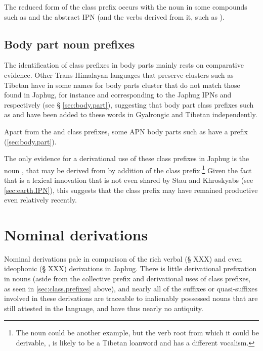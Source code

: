 The reduced form  of the class prefix occurs with the noun  in some compounds such as  and the abstract IPN  (and the verbs derived from it, such as ).
  
\subsection{Body part noun prefixes}  \label{ex:body.part.prefix}
The identification of class prefixes in body parts mainly rests on comparative evidence. Other Trans-Himalayan languages that preserve clusters such as Tibetan have in some names for body parts cluster that do not match those found in Japhug, for instance  and  corresponding to the Japhug IPNs  and  respectively (see § \ref{sec:body.part}), suggesting that body part class prefixes such as  and  have been added to these words in Gyalrongic and Tibetan independently.

Apart from the  and  class prefixes, some APN body parts such as  have a   prefix (\ref{sec:body.part}).

The only evidence for a derivational use of these class prefixes in Japhug is the noun , that may be derived from  by addition of the  class prefix.\footnote{The noun  could be another example, but the verb root from which it could be derivable, , is likely to be a Tibetan loanword and has a different vocalism. } Given the fact that  is a lexical innovation that is not even shared by Stau and Khroskyabs (see \ref{sec:earth.IPN}), this suggests that the class prefix  may have remained productive even relatively recently.

\section{Nominal derivations}
Nominal derivations pale in comparison of the rich verbal (§ XXX) and even ideophonic (§ XXX) derivations in Japhug. There is little derivational prefixation in nouns (aside from the collective  prefix and derivational uses of class prefixes, as seen in \ref{sec:class.prefixes} above), and nearly all of the suffixes or quasi-suffixes involved in these derivations are traceable to inalienably possessed nouns that are still attested in the language, and have thus nearly no antiquity. 

